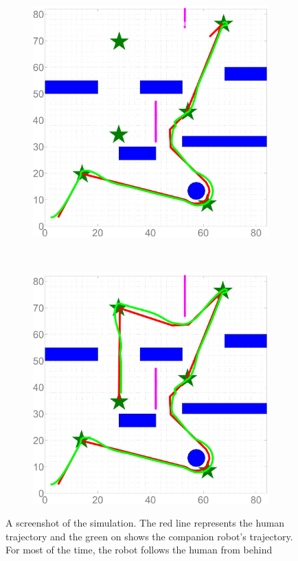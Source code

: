 \documentclass[letterpaper, 10 pt, conference]{ieeeconf}
\begin{document}
\begin{figure}
\begin{subfigure}{0.2\textwidth}
			\caption{}
			\label{fig:ref_traj_obs1}
		\end{subfigure}
		~
		\begin{subfigure}{0.2\textwidth}
			\includegraphics[width=\textwidth]{figures/sim_traj_obs2}
			\caption{}
			\label{fig:ref_traj_obs2}
		\end{subfigure}
		~
		\begin{subfigure}{0.2\textwidth}
			\includegraphics[width=\textwidth]{figures/sim_traj_end}
			\caption{}
			\label{fig:ref_traj_accom}
		\end{subfigure}
		\caption{A screenshot of the simulation. The red line represents the human trajectory and the green on shows the companion robot's trajectory. For most of the time, the robot follows the human from behind}
	\end{figure}
\end{document}
